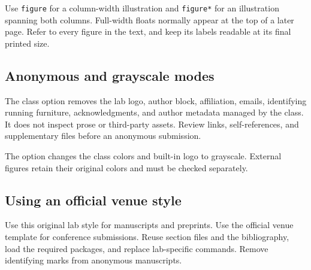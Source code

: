 Use \verb|figure| for a column-width illustration and
\verb|figure*| for an illustration spanning both columns. Full-width
floats normally appear at the top of a later page. Refer to every figure
in the text, and keep its labels readable at its final printed size.

\subsection{Anonymous and grayscale modes}
The  class option removes the lab logo, author block,
affiliation, emails, identifying running furniture, acknowledgments, and
author metadata managed by the class. It does not inspect prose or
third-party assets. Review links, self-references, and supplementary files
before an anonymous submission.

The  option changes the class colors and built-in logo to
grayscale. External figures retain their original colors and must be
checked separately.

\subsection{Using an official venue style}
Use this original lab style for manuscripts and preprints. Use the official
venue template for conference submissions. Reuse section files and the
bibliography, load the required packages, and replace lab-specific commands.
Remove identifying marks from anonymous manuscripts.

